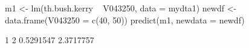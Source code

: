 \begin{Schunk}
\begin{Sinput}
 m1 <- lm(th.bush.kerry ~ V043250, data = mydta1)
 newdf <- data.frame(V043250 = c(40, 50))
 predict(m1, newdata = newdf)
\end{Sinput}
\begin{Soutput}
        1         2 
0.5291547 2.3717757 
\end{Soutput}
\end{Schunk}
